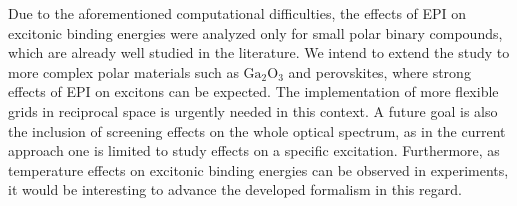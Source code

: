 Due to the aforementioned computational difficulties, the effects of EPI on excitonic binding energies were analyzed only for small polar binary compounds, which are already well studied in the literature. We intend to extend the study to more complex polar materials such as $\text{Ga}_2\text{O}_3$ and perovskites, where strong effects of EPI on excitons can be expected.  The implementation of more flexible grids in reciprocal space is urgently needed in this context.  A future goal is also the inclusion of screening effects on the whole optical spectrum, as in the current approach one is limited to study effects on a specific excitation. Furthermore, as temperature effects on excitonic binding energies can be observed in experiments\cite{exciton_perovskites}, it would be interesting to advance the developed formalism in this regard.
